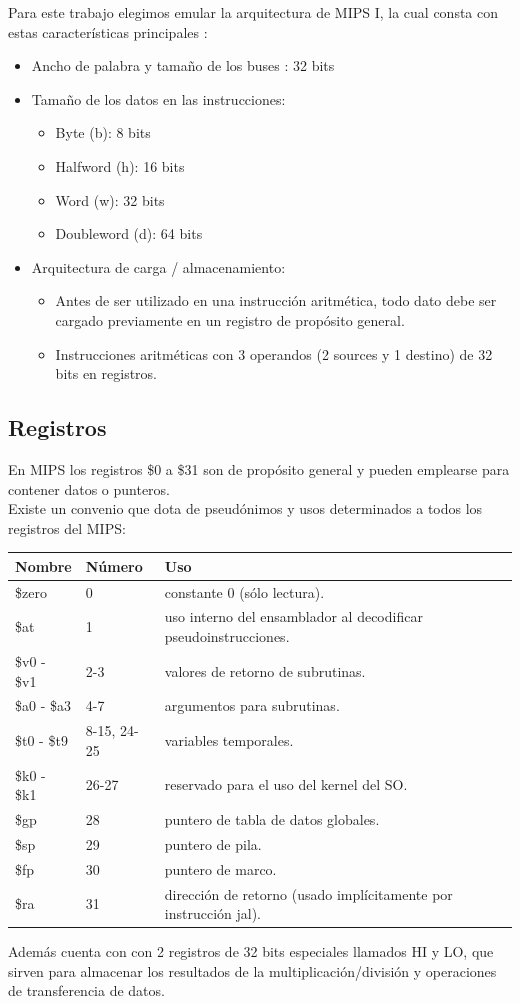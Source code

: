 \documentclass[12pt]{article}
\begin{document}
Para este trabajo elegimos emular  la arquitectura de MIPS I, la cual consta con estas características  principales :
\begin{itemize}
\item Ancho de palabra y tamaño de los buses : 32 bits
\item  Tamaño de los datos en las instrucciones:
	\begin{itemize}
	\item Byte (b): 8 bits
	\item Halfword (h): 16 bits
	\item Word (w): 32 bits
	\item Doubleword (d): 64 bits
	\end{itemize}
 \item Arquitectura de carga / almacenamiento:
 	\begin{itemize}
 	\item Antes de ser utilizado en una instrucción aritmética, todo dato debe
 	ser cargado previamente en un registro de propósito general.
 	\item Instrucciones aritméticas con 3 operandos (2 sources y 1 destino) de 32 bits en registros.
 	\end{itemize} 
\end{itemize}
\subsection{Registros}
En MIPS los registros \$0 a \$31 son de propósito general y pueden emplearse
para contener datos o punteros.\\
Existe un convenio que dota de pseudónimos y usos determinados a todos los
registros del MIPS:

\begin{table}[H]
\centering
	\begin{tabular}{@{}lll@{}}
	\toprule
	\multicolumn{1}{c}{Nombre} & Número & Uso          \\ \midrule
	\$zero                & 0 & constante 0 (sólo lectura). \\
	\$at                  & 1 & uso interno del ensamblador al decodificar pseudoinstrucciones. \\
	\$v0 - \$v1       & 2-3 & valores de retorno de subrutinas. \\
	\$a0 - \$a3      & 4-7 & argumentos para subrutinas. \\
	\$t0 - \$t9      & 8-15, 24-25 & variables temporales. \\   
	\$k0 - \$k1     & 26-27 & reservado para el uso del kernel del SO.\\   
	\$gp                 & 28 & puntero de tabla de datos globales.\\
	\$sp                & 29 & puntero de pila.\\
	\$fp                 & 30 & puntero de marco. \\
	\$ra                 & 31 & dirección de retorno (usado implícitamente por instrucción jal).
	\end{tabular}%
\end{table}
Además cuenta con con 2 registros de 32 bits especiales  llamados HI y LO, que sirven
para almacenar los resultados de la multiplicación/división y operaciones de transferencia de datos.
\end{document}
